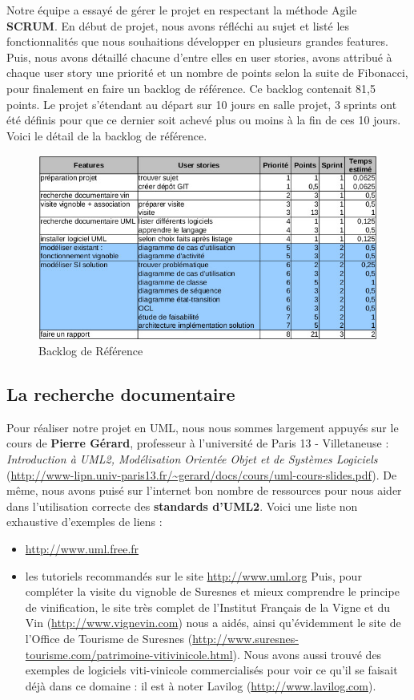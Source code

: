 \documentclass[a4paper, titlepage]{report}
\begin{document}
Notre équipe a essayé de gérer le projet en respectant la méthode Agile
\textbf{SCRUM}. En début de projet, nous avons réfléchi au sujet et
listé les fonctionnalités que nous souhaitions développer en plusieurs
grandes features. Puis, nous avons détaillé chacune d'entre elles en
user stories, avons attribué à chaque user story une priorité et un
nombre de points selon la suite de Fibonacci, pour finalement en faire
un backlog de référence. Ce backlog contenait 81,5 points. Le projet
s'étendant au départ sur 10 jours en salle projet, 3 sprints ont été
définis pour que ce dernier soit achevé plus ou moins à la fin de ces 10
jours. Voici le détail de la backlog de référence.

\begin{figure}[!h]
\centering
\includegraphics{Images/GestionProjet.jpg}
\caption{Backlog de Référence}
\end{figure}

\subsection{La recherche documentaire}

Pour réaliser notre projet en UML, nous nous sommes largement appuyés
sur le cours de \textbf{Pierre Gérard}, professeur à l'université de
Paris 13 - Villetaneuse : \emph{Introduction à UML2, Modélisation
Orientée Objet et de Systèmes Logiciels}
(\url{http://www-lipn.univ-paris13.fr/~gerard/docs/cours/uml-cours-slides.pdf}).
De même, nous avons puisé sur l'internet bon nombre de ressources pour
nous aider dans l'utilisation correcte des \textbf{standards d'UML2}.
Voici une liste non exhaustive d'exemples de liens : 
\begin{itemize}
\item \url{http://www.uml.free.fr}
\item les tutoriels recommandés sur le site
\url{http://www.uml.org} Puis, pour compléter la visite du vignoble de
Suresnes et mieux comprendre le principe de vinification, le site très
complet de l'Institut Français de la Vigne et du Vin
(\url{http://www.vignevin.com}) nous a aidés, ainsi qu'évidemment le
site de l'Office de Tourisme de Suresnes
(\url{http://www.suresnes-tourisme.com/patrimoine-vitivinicole.html}).
Nous avons aussi trouvé des exemples de logiciels viti-vinicole
commercialisés pour voir ce qu'il se faisait déjà dans ce domaine : il
est à noter Lavilog (\url{http://www.lavilog.com}).
\end{itemize}
\end{document}
